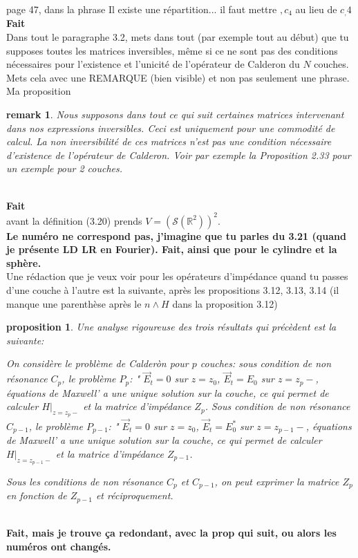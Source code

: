 \documentclass{article}
\newtheorem{proposition}{proposition}
\newtheorem{remark}{remark}
\newcommand{\R}{\mathbb{R}}
\newcommand{\rep}[1]{\\\textbf{#1}\\}
\begin{document}
page 47, dans la phrase Il existe une répartition... il faut mettre $,c_4$ au lieu de $c_,4$
\rep{Fait}

Dans tout le paragraphe 3.2, mets dans tout (par exemple tout au début) que tu supposes toutes les matrices inversibles, même si ce ne sont pas des conditions nécessaires pour l'existence et l'unicité de l'opérateur de Calderon du $N$ couches. Mets cela avec une REMARQUE (bien visible) et non pas seulement une phrase. Ma proposition
\begin{remark}
Nous supposons dans tout ce qui suit certaines matrices intervenant dans nos expressions inversibles. Ceci est uniquement pour une commodité de calcul. La non inversibilité de ces matrices n'est pas une condition nécessaire d'existence de l'opérateur de Calderon. Voir par exemple la Proposition 2.33 pour un exemple pour 2 couches.
\end{remark}
~{}\rep{Fait}

avant la définition (3.20) prends $V=(\mathcal{S}(\R^2))^2$.
\rep{Le numéro ne correspond pas, j'imagine que tu parles du 3.21 (quand je présente LD LR en Fourier). Fait, ainsi que pour le cylindre et la sphère.}

Une rédaction que je veux voir pour les opérateurs d'impédance quand tu passes d'une couche à l'autre est la suivante, après les propositions  3.12, 3.13, 3.14 (il manque une parenthèse après le $n\wedge H$ dans la proposition 3.12)
\begin{proposition}
Une analyse rigoureuse des trois résultats qui précèdent est la suivante:

On considère le problème de Calder\`on pour $p$ couches: sous condition de non résonance $C_p$, le problème $P_p$: " ${\vec E}_t=0$ sur $z=z_0$, ${\vec E}_t=E_0$ sur $z=z_p-$, équations de Maxwell'  a une unique solution sur la couche, ce qui permet de calculer $H\vert_{z=z_p-}$ et la matrice d'impédance $Z_{p}$. Sous condition de non résonance $C_{p-1}$, le problème $P_{p-1}$: " ${\vec E}_t=0$ sur $z=z_0$, ${\vec E}_t=E_0^*$ sur $z=z_{p-1}-$, équations de Maxwell'  a une unique solution sur la couche, ce qui permet de calculer $H\vert_{z=z_{p-1}-}$ et la matrice d'impédance $Z_{p-1}$.

Sous les conditions de non résonance $C_p$ et $C_{p-1}$, on peut exprimer la matrice $Z_p$ en fonction de $Z_{p-1}$ et réciproquement.


\end{proposition}

~{}
\rep{Fait, mais je trouve ça redondant, avec la prop qui suit, ou alors les numéros ont changés.}


 
\end{document}
